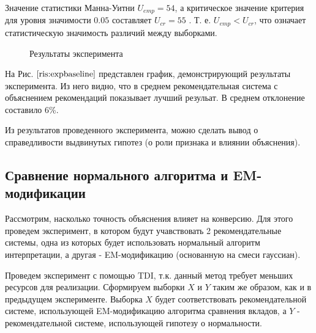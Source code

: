 \documentclass[12pt,a4paper]{report}
\begin{document}
Значение статистики Манна-Уитни $U_{emp} = 54$, а критическое значение критерия для уровня значимости $0.05$ составляет $U_{cr} = 55$ \cite{Mw}. Т. е. $U_{emp} < U_{cr}$, что означает статистическую значимость различий между выборками.

\begin{figure}[H]
\caption{Результаты эксперимента}
\label{ris:expbaseline}
\end{figure}

На Рис. $\ref{ris:expbaseline}$ представлен график, демонстрирующий результаты эксперимента. Из него видно, что в среднем рекомендательная система с объяснением рекомендаций показывает лучший резульат. В среднем отклонение составило 6\%.

Из результатов проведенного эксперимента, можно сделать вывод о справедливости выдвинутых гипотез (о роли признака и влиянии объяснения).

\subsection{Сравнение нормального алгоритма и  EM-модификации}
Рассмотрим, насколько точность объяснения влияет на конверсию. Для этого проведем эксперимент, в котором будут учавствовать 2 рекомендательные системы, одна из которых будет использовать нормальный алгоритм интерпретации, а другая - EM-модификацию (основанную на смеси гауссиан).

Проведем эксперимент с помощью TDI, т.к. данный метод требует меньших ресурсов для реализации. Сформируем выборки $X$ и $Y$ таким же образом, как и в предыдущем эксперименте. Выборка $X$ будет соответствовать рекомендательной системе, использующей EM-модификацию алгоритма сравнения вкладов, а $Y$ - рекомендательной системе, использующей гипотезу о нормальности. 
\end{document}
